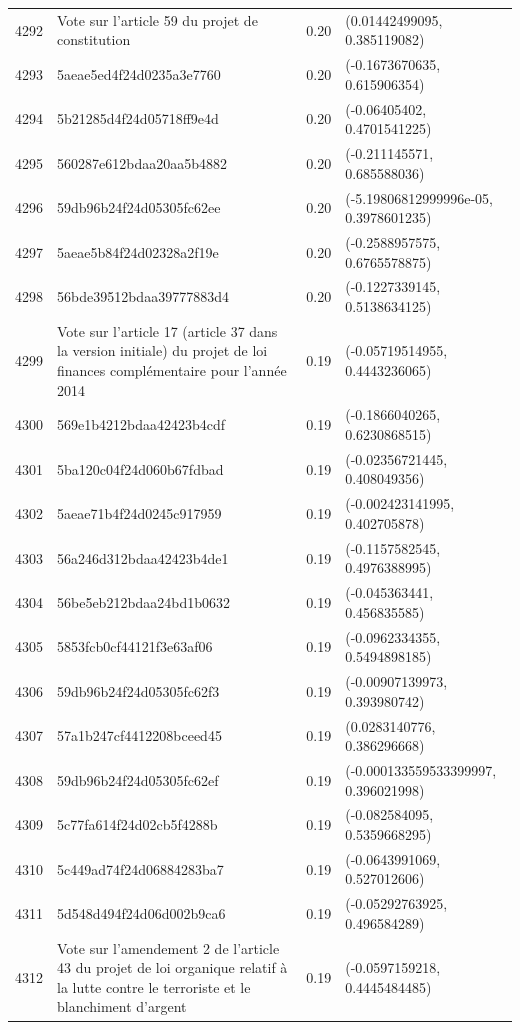 \begin{table}[ht]
\begin{tabular}{rlrl}
  4292 & Vote sur l'article 59 du projet de constitution & 0.20 & (0.01442499095, 0.385119082) \\ 
  4293 & 5aeae5ed4f24d0235a3e7760 & 0.20 & (-0.1673670635, 0.615906354) \\ 
  4294 & 5b21285d4f24d05718ff9e4d & 0.20 & (-0.06405402, 0.4701541225) \\ 
  4295 & 560287e612bdaa20aa5b4882 & 0.20 & (-0.211145571, 0.685588036) \\ 
  4296 & 59db96b24f24d05305fc62ee & 0.20 & (-5.19806812999996e-05, 0.3978601235) \\ 
  4297 & 5aeae5b84f24d02328a2f19e & 0.20 & (-0.2588957575, 0.6765578875) \\ 
  4298 & 56bde39512bdaa39777883d4 & 0.20 & (-0.1227339145, 0.5138634125) \\ 
  4299 & Vote sur l'article 17 (article 37 dans la version initiale) du projet de loi finances complémentaire pour l'année 2014 & 0.19 & (-0.05719514955, 0.4443236065) \\ 
  4300 & 569e1b4212bdaa42423b4cdf & 0.19 & (-0.1866040265, 0.6230868515) \\ 
  4301 & 5ba120c04f24d060b67fdbad & 0.19 & (-0.02356721445, 0.408049356) \\ 
  4302 & 5aeae71b4f24d0245c917959 & 0.19 & (-0.002423141995, 0.402705878) \\ 
  4303 & 56a246d312bdaa42423b4de1 & 0.19 & (-0.1157582545, 0.4976388995) \\ 
  4304 & 56be5eb212bdaa24bd1b0632 & 0.19 & (-0.045363441, 0.456835585) \\ 
  4305 & 5853fcb0cf44121f3e63af06 & 0.19 & (-0.0962334355, 0.5494898185) \\ 
  4306 & 59db96b24f24d05305fc62f3 & 0.19 & (-0.00907139973, 0.393980742) \\ 
  4307 & 57a1b247cf4412208bceed45 & 0.19 & (0.0283140776, 0.386296668) \\ 
  4308 & 59db96b24f24d05305fc62ef & 0.19 & (-0.000133559533399997, 0.396021998) \\ 
  4309 & 5c77fa614f24d02cb5f4288b & 0.19 & (-0.082584095, 0.5359668295) \\ 
  4310 & 5c449ad74f24d06884283ba7 & 0.19 & (-0.0643991069, 0.527012606) \\ 
  4311 & 5d548d494f24d06d002b9ca6 & 0.19 & (-0.05292763925, 0.496584289) \\ 
  4312 & Vote sur l'amendement 2 de l'article 43 du projet de loi organique relatif à la lutte contre le terroriste et le blanchiment d'argent & 0.19 & (-0.0597159218, 0.4445484485) \\ 

\end{tabular}
\end{table}
